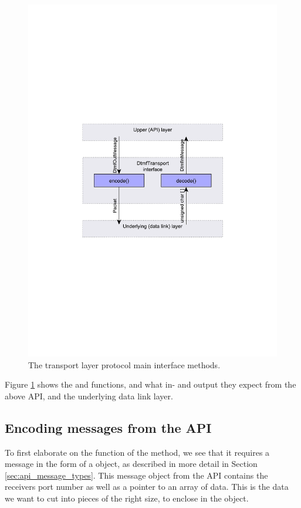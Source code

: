 \begin{figure}[htb]
 \centering
 \includegraphics[scale=0.66,trim=0 280 0 275]{content/graphics/transport/trans_encode_decode.pdf}%
 \caption{The transport layer protocol main interface methods.}
 \label{fig:trans_encode_decode}
\end{figure}

Figure \ref{fig:trans_encode_decode} shows the  and  functions, and what in- and output they expect from the above API, and the underlying data link layer.


\subsection{Encoding messages from the API}
To first elaborate on the function of the  method, we see that it requires a message in the form of a  object, as described in more detail in Section \ref{sec:api_message_types}. This message object from the API contains the receivers port number as well as a pointer to an array of data. This is the data we want to cut into pieces of the right size, to enclose in the  object.

